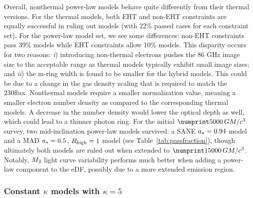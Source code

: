 Overall, \hamr nonthermal power-law models behave quite differently from their thermal versions.
For the thermal models, both EHT and non-EHT constraints are equally successful in ruling out models (with 22\% passed cases for each constraint set). For the power-law model set, we see some differences: non-EHT constraints pass 39\% models while EHT constraints allow 10\% models.
This disparity occurs for two reasons:
\emph{i}) introducing non-thermal electrons pushes the 86 GHz image size to the acceptable range as thermal models typically exhibit small image sizes; and
\emph{ii}) the m-ring width is found to be smaller for the hybrid models.
This could be due to a change in the gas density scaling that is required to match the 230\GHz flux.
Nonthermal models require a smaller normalization value, meaning a smaller electron number density as compared to the corresponding thermal models.
A decrease in the number density would lower the optical depth as well, which could lead to a thinner photon ring.
For the initial $\no{5000}\,\tg$ survey, two mid-inclination power-law models survived: a SANE $a_*=0.94$ model and a MAD $a_*=0.5$, $R_\mathrm{high}=1$ model (see Table~\ref{tab:passfraction}), though ultimately both models are ruled out when extended to $\no{15000}\,\tg$. 
Notably, $M_{3}$ light curve variability performs much better when adding a power-law component to the eDF, possibly due to a more extended emission region.

\subsubsection{Constant \texorpdfstring{$\kappa$}{kappa} models with \texorpdfstring{$\kappa = 5$}{kappa = 5}}
\label{sec:constant_kappa}

